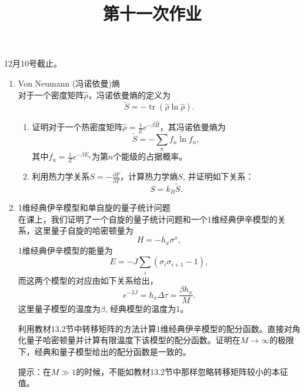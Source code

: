 \documentclass[12pt,aps,pra,notitlepage]{revtex4-1}
\DeclareMathOperator{\tr}{tr}
\begin{document}
\title{第十一次作业}
\maketitle
\begin{center}
  12月10号截止。
\end{center}
\begin{enumerate}
  \item Von Neumann (冯诺依曼)熵\\
  对于一个密度矩阵$\hat\rho$，冯诺依曼熵的定义为
  \[\tilde S = -\tr(\hat\rho\ln\hat\rho).\]
  \begin{enumerate}
    \item 证明对于一个热密度矩阵$\hat\rho=\frac1Ze^{-\beta\hat H}$，其冯诺依曼熵为
    \[\tilde S =-\sum_nf_n\ln f_n,\]
    其中$f_n=\frac1Ze^{-\beta E_n}$为第$n$个能级的占据概率。
    \item 利用热力学关系$S=-\frac{\partial F}{\partial T}$，计算热力学熵$S$, 并证明如下关系：
    \[S = k_B\tilde S.\]
  \end{enumerate}
  \item 1维经典伊辛模型和单自旋的量子统计问题\\
  在课上，我们证明了一个自旋的量子统计问题和一个1维经典伊辛模型的关系，这里量子自旋的哈密顿量为
  \[H=-h_x\sigma^x,\]
  1维经典伊辛模型的能量为
  \[E=-J\sum_i(\sigma_i\sigma_{i+1}-1),\]
  而这两个模型的对应由如下关系给出，
  \[e^{-2J} = h_x\Delta\tau = \frac{\beta h_x}M.\]
  这里量子模型的温度为$\beta$, 经典模型的温度为1。

  利用教材13.2节中转移矩阵的方法计算1维经典伊辛模型的配分函数。直接对角化量子哈密顿量并计算有限温度下该模型的配分函数。证明在$M\rightarrow\infty$的极限下，经典和量子模型给出的配分函数是一致的。

  提示：在$M\gg1$的时候，不能如教材13.2节中那样忽略转移矩阵较小的本征值。
\end{enumerate}
\end{document}
